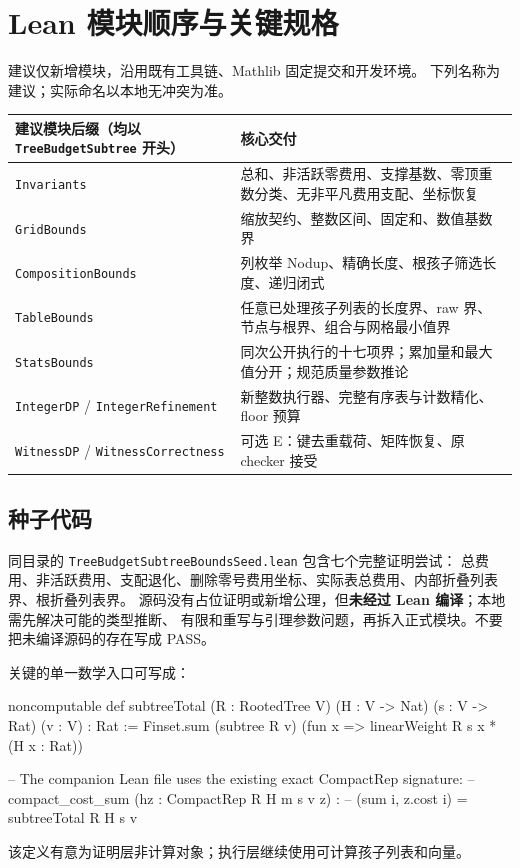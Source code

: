 \documentclass[UTF8,a4paper,11pt]{ctexart}
\theoremstyle{definition}
\begin{document}
\section{Lean 模块顺序与关键规格}

建议仅新增模块，沿用既有工具链、Mathlib 固定提交和开发环境。
下列名称为建议；实际命名以本地无冲突为准。
\begin{longtable}{p{}p{}}
\toprule 建议模块后缀（均以 \texttt{TreeBudgetSubtree} 开头） & 核心交付 \\ \midrule
\texttt{Invariants} & 总和、非活跃零费用、支撑基数、零顶重数分类、无非平凡费用支配、坐标恢复 \\
\texttt{GridBounds} & 缩放契约、整数区间、固定和、数值基数界 \\
\texttt{CompositionBounds} & 列枚举 Nodup、精确长度、根孩子筛选长度、递归闭式 \\
\texttt{TableBounds} & 任意已处理孩子列表的长度界、raw 界、节点与根界、组合与网格最小值界 \\
\texttt{StatsBounds} & 同次公开执行的十七项界；累加量和最大值分开；规范质量参数推论 \\
\texttt{IntegerDP} / \texttt{IntegerRefinement} & 新整数执行器、完整有序表与计数精化、floor 预算 \\
\texttt{WitnessDP} / \texttt{WitnessCorrectness} & 可选 E：键去重载荷、矩阵恢复、原 checker 接受 \\
\bottomrule
\end{longtable}

\subsection{种子代码}
同目录的 \texttt{TreeBudgetSubtreeBoundsSeed.lean} 包含七个完整证明尝试：
总费用、非活跃费用、支配退化、删除零号费用坐标、实际表总费用、内部折叠列表界、根折叠列表界。
源码没有占位证明或新增公理，但\textbf{未经过 Lean 编译}；本地需先解决可能的类型推断、
有限和重写与引理参数问题，再拆入正式模块。不要把未编译源码的存在写成 PASS。

关键的单一数学入口可写成：
\begin{Code}
noncomputable def subtreeTotal (R : RootedTree V)
    (H : V -> Nat) (s : V -> Rat) (v : V) : Rat :=
  Finset.sum (subtree R v)
    (fun x => linearWeight R s x * (H x : Rat))

-- The companion Lean file uses the existing exact CompactRep signature:
-- compact_cost_sum (hz : CompactRep R H m s v z) :
--   (sum i, z.cost i) = subtreeTotal R H s v
\end{Code}
该定义有意为证明层非计算对象；执行层继续使用可计算孩子列表和向量。
\end{document}
